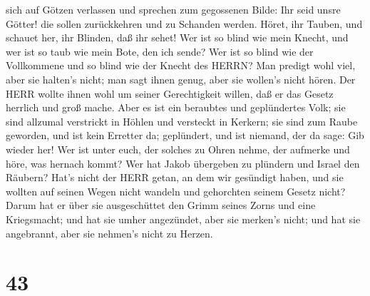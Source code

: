 sich auf Götzen verlassen und sprechen zum gegossenen Bilde: Ihr seid
unsre Götter! die sollen zurückkehren und zu Schanden werden.
 Höret, ihr Tauben, und schauet her, ihr Blinden, daß ihr
sehet!  Wer ist so blind wie mein Knecht, und wer ist so
taub wie mein Bote, den ich sende? Wer ist so blind wie der Vollkommene
und so blind wie der Knecht des HERRN?  Man predigt wohl
viel, aber sie halten's nicht; man sagt ihnen genug, aber sie wollen's
nicht hören.  Der HERR wollte ihnen wohl um seiner
Gerechtigkeit willen, daß er das Gesetz herrlich und groß mache.
 Aber es ist ein beraubtes und geplündertes Volk; sie sind
allzumal verstrickt in Höhlen und versteckt in Kerkern; sie sind zum
Raube geworden, und ist kein Erretter da; geplündert, und ist niemand,
der da sage: Gib wieder her!  Wer ist unter euch, der
solches zu Ohren nehme, der aufmerke und höre, was hernach kommt?
 Wer hat Jakob übergeben zu plündern und Israel den
Räubern? Hat's nicht der HERR getan, an dem wir gesündigt haben, und sie
wollten auf seinen Wegen nicht wandeln und gehorchten seinem Gesetz
nicht?  Darum hat er über sie ausgeschüttet den Grimm
seines Zorns und eine Kriegsmacht; und hat sie umher angezündet, aber
sie merken's nicht; und hat sie angebrannt, aber sie nehmen's nicht zu
Herzen.

\hypertarget{section-42}{%
\section{43}\label{section-42}}

